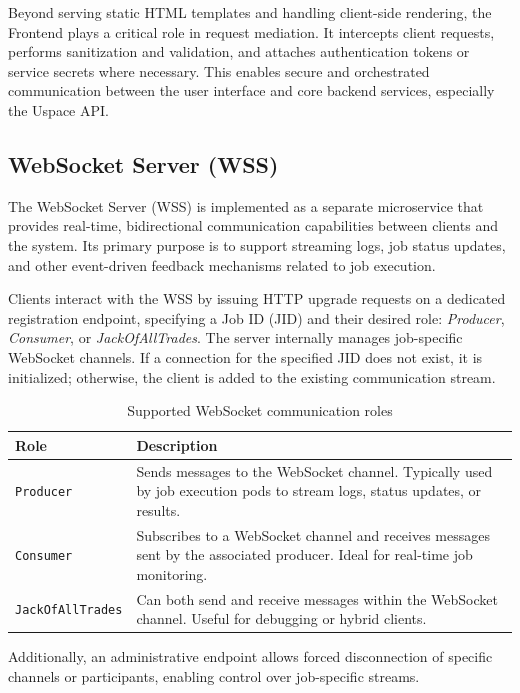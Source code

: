 Beyond serving static HTML templates and handling client-side rendering, the Frontend plays a critical role in request mediation. It intercepts client requests, performs sanitization and validation, and attaches authentication tokens or service secrets where necessary. This enables secure and orchestrated communication between the user interface and core backend services, especially the Uspace API.

\subsection{WebSocket Server (WSS)}

The WebSocket Server (WSS) is implemented as a separate microservice that provides real-time, bidirectional communication capabilities between clients and the system. Its primary purpose is to support streaming logs, job status updates, and other event-driven feedback mechanisms related to job execution.

Clients interact with the WSS by issuing HTTP upgrade requests on a dedicated registration endpoint, specifying a Job ID (JID) and their desired role: \textit{Producer}, \textit{Consumer}, or \textit{JackOfAllTrades}. The server internally manages job-specific WebSocket channels. If a connection for the specified JID does not exist, it is initialized; otherwise, the client is added to the existing communication stream.

\begin{table}[H]
\centering
\begin{tabular}{|l|p{10cm}|}
\hline
\textbf{Role} & \textbf{Description} \\
\hline
\texttt{Producer} & Sends messages to the WebSocket channel. Typically used by job execution pods to stream logs, status updates, or results. \\
\texttt{Consumer} & Subscribes to a WebSocket channel and receives messages sent by the associated producer. Ideal for real-time job monitoring. \\
\texttt{JackOfAllTrades} & Can both send and receive messages within the WebSocket channel. Useful for debugging or hybrid clients. \\
\hline
\end{tabular}
\caption{Supported WebSocket communication roles}
\label{tab:wss-roles}
\end{table}


Additionally, an administrative endpoint allows forced disconnection of specific channels or participants, enabling control over job-specific streams.


